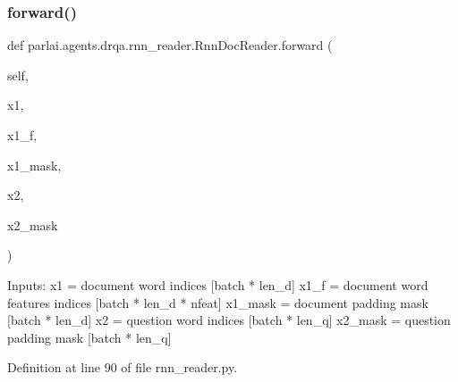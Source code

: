 \subsubsection{\texorpdfstring{forward()}{forward()}}
{\footnotesize\ttfamily def parlai.\+agents.\+drqa.\+rnn\+\_\+reader.\+Rnn\+Doc\+Reader.\+forward (\begin{DoxyParamCaption}\item[{}]{self,  }\item[{}]{x1,  }\item[{}]{x1\+\_\+f,  }\item[{}]{x1\+\_\+mask,  }\item[{}]{x2,  }\item[{}]{x2\+\_\+mask }\end{DoxyParamCaption})}

\begin{DoxyVerb}Inputs:
x1 = document word indices             [batch * len_d]
x1_f = document word features indices  [batch * len_d * nfeat]
x1_mask = document padding mask        [batch * len_d]
x2 = question word indices             [batch * len_q]
x2_mask = question padding mask        [batch * len_q]
\end{DoxyVerb}
 

Definition at line 90 of file rnn\+\_\+reader.\+py.


